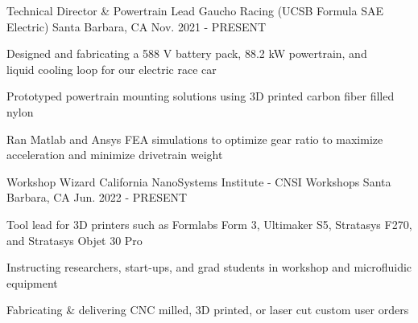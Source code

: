 

\begin{cventries}
\cventry
{Technical Director \& Powertrain Lead} %
{Gaucho Racing (UCSB Formula SAE Electric)} %
{Santa Barbara, CA} %
{Nov. 2021 - PRESENT} %
{ %
\begin{cvitems}   
\item {Designed and fabricating a 588 V battery pack, 88.2 kW powertrain, and \\ liquid cooling loop for our electric race car}
\item {Prototyped powertrain mounting solutions using 3D printed carbon fiber filled nylon}
\item {Ran Matlab and Ansys FEA simulations to optimize gear ratio to maximize acceleration and minimize drivetrain weight}
\end{cvitems}
}


\cventry
{Workshop Wizard} %
{California NanoSystems Institute - CNSI Workshops} %
{Santa Barbara, CA} %
{Jun. 2022 - PRESENT} %
{ %
\begin{cvitems}
\item {Tool lead for 3D printers such as Formlabs Form 3, Ultimaker S5, Stratasys F270, and Stratasys Objet 30 Pro}
\item {Instructing researchers, start-ups, and grad students in workshop and microfluidic equipment}
\item {Fabricating \& delivering CNC milled, 3D printed, or laser cut custom user orders }
\end{cvitems}
}





\end{cventries}
